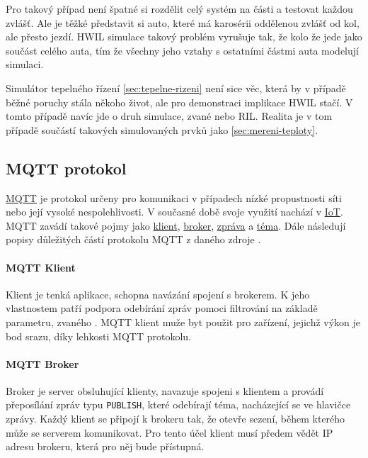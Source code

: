 Pro takový případ není špatné si rozdělit celý systém na části a testovat každou zvlášť. Ale je těžké představit si auto, které má karosérii oddělenou zvlášť od kol, ale přesto jezdí. HWIL simulace takový problém vyrušuje tak, že kolo  že jede jako součást celého auta, tím že všechny jeho vztahy s ostatními částmi auta modelují simulaci.

Simulátor tepelného řízení \ref{sec:tepelne-rizeni} není sice věc, která by v případě běžné poruchy stála někoho život, ale pro demonstraci implikace HWIL stačí. V tomto případě navíc jde o druh simulace, zvané  nebo RIL. Realita je v tom případě součástí takových simulovaných prvků jako \ref{sec:mereni-teploty}.

\subsection{MQTT protokol}
\label{subsec:mqtt-proto}

\href{http://mqtt.org/}{MQTT} je protokol určeny pro komunikaci v případech nízké propustnosti síti nebo její vysoké nespolehlivosti. V současné době svoje využití nachází v \href{https://en.wikipedia.org/wiki/Internet_of_things}{IoT}. MQTT zavádí takové pojmy jako \hyperref[par:client]{klient}, \hyperref[par:broker]{broker}, \hyperref[par:message]{zpráva} a \hyperref[par:topic]{téma}. Dále následují popisy důležitých částí protokolu MQTT z daného zdroje \cite{mqtt}.

\paragraph{MQTT Klient}
\label{par:client}

Klient je tenká aplikace, schopna navázání spojení s brokerem. K jeho vlastnostem patří podpora odebírání zpráv pomoci filtrování na základě parametru, zvaného \hyperref[par:topic]{}. MQTT klient muže byt použit pro zařízení, jejichž výkon je bod srazu, díky lehkosti MQTT protokolu.

\paragraph{MQTT Broker}
\label{par:broker}

Broker je server obsluhující klienty, navazuje spojeni s klientem a provádí přeposílání zpráv typu \texttt{PUBLISH}, které odebírají téma, nacházející se ve hlavičce zprávy. Každý klient se připojí k brokeru tak, že otevře sezení, během kterého může se serverem komunikovat. Pro tento účel klient musí předem vědět IP adresu brokeru, která pro něj bude přístupná.

